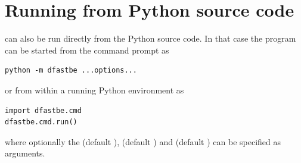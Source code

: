 \section{Running from Python source code}
\dfastbe can also be run directly from the Python source code.
In that case the program can be started from the command prompt as

\begin{Verbatim}
python -m dfastbe ...options...
\end{Verbatim}

or from within a running Python environment as

\begin{Verbatim}
import dfastbe.cmd
dfastbe.cmd.run()
\end{Verbatim}

where optionally the  (default ),  (default ) and  (default ) can be specified as arguments.